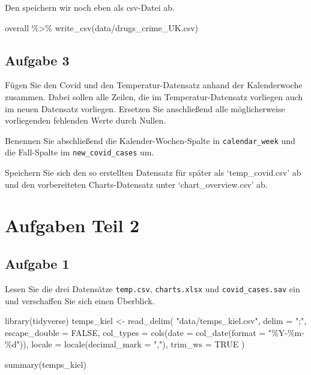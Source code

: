 \documentclass[
]{book}
\newenvironment{Shaded}{\begin{snugshade}}{\end{snugshade}}
\newcommand{\AttributeTok}[1]{\textcolor[rgb]{0.77,0.63,0.00}{#1}}
\newcommand{\ConstantTok}[1]{\textcolor[rgb]{0.00,0.00,0.00}{#1}}
\newcommand{\FunctionTok}[1]{\textcolor[rgb]{0.00,0.00,0.00}{#1}}
\newcommand{\NormalTok}[1]{#1}
\newcommand{\OtherTok}[1]{\textcolor[rgb]{0.56,0.35,0.01}{#1}}
\newcommand{\SpecialCharTok}[1]{\textcolor[rgb]{0.00,0.00,0.00}{#1}}
\newcommand{\StringTok}[1]{\textcolor[rgb]{0.31,0.60,0.02}{#1}}
\begin{document}
Den speichern wir noch eben als csv-Datei ab.

\begin{Shaded}
\begin{Highlighting}[]
\NormalTok{overall }\SpecialCharTok{\%\textgreater{}\%} \FunctionTok{write\_csv}\NormalTok{(}\StringTok{\textquotesingle{}data/drugs\_crime\_UK.csv\textquotesingle{}}\NormalTok{)}
\end{Highlighting}
\end{Shaded}

\hypertarget{aufgabe-3}{%
\subsection{Aufgabe 3}\label{aufgabe-3}}

Fügen Sie den Covid und den Temperatur-Datensatz anhand der Kalenderwoche zusammen. Dabei sollen alle Zeilen, die im Temperatur-Datensatz vorliegen auch im neuen Datensatz vorliegen.
Ersetzen Sie anschließend alle möglicherweise vorliegenden fehlenden Werte durch Nullen.

Benennen Sie abschließend die Kalender-Wochen-Spalte in \texttt{calendar\_week} und die Fall-Spalte im \texttt{new\_covid\_cases} um.

Speichern Sie sich den so erstellten Datensatz für später als `temp\_covid.csv' ab und den vorbereiteten Charts-Datensatz unter `chart\_overview.csv' ab.

\hypertarget{aufgaben-teil-2}{%
\section{Aufgaben Teil 2}\label{aufgaben-teil-2}}

\hypertarget{aufgabe-1-3}{%
\subsection{Aufgabe 1}\label{aufgabe-1-3}}

Lesen Sie die drei Datensätze \texttt{temp.csv}, \texttt{charts.xlsx} und \texttt{covid\_cases.sav} ein und verschaffen Sie sich einen Überblick.

\hypertarget{solution1}{}
\begin{Shaded}
\begin{Highlighting}[]
\FunctionTok{library}\NormalTok{(tidyverse)}
\NormalTok{temps\_kiel }\OtherTok{\textless{}{-}} \FunctionTok{read\_delim}\NormalTok{(}
  \StringTok{"data/temps\_kiel.csv"}\NormalTok{,}
  \AttributeTok{delim =} \StringTok{";"}\NormalTok{,}
  \AttributeTok{escape\_double =} \ConstantTok{FALSE}\NormalTok{,}
  \AttributeTok{col\_types =} \FunctionTok{cols}\NormalTok{(}\AttributeTok{date =} \FunctionTok{col\_date}\NormalTok{(}\AttributeTok{format =} \StringTok{"\%Y{-}\%m{-}\%d"}\NormalTok{)),}
  \AttributeTok{locale =} \FunctionTok{locale}\NormalTok{(}\AttributeTok{decimal\_mark =} \StringTok{","}\NormalTok{),}
  \AttributeTok{trim\_ws =} \ConstantTok{TRUE}
\NormalTok{)}


\FunctionTok{summary}\NormalTok{(temps\_kiel)}
\end{Highlighting}
\end{Shaded}
\end{document}
